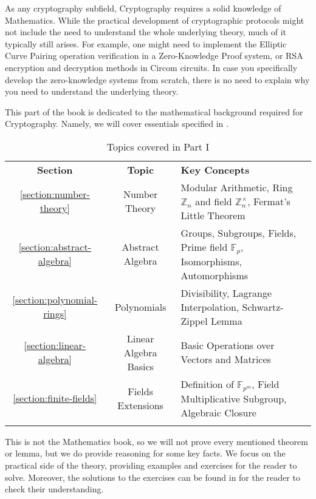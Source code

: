 \documentclass[../../lecture-notes-148x210.tex]{subfiles}
\begin{document}
As any cryptography subfield, Cryptography requires a solid knowledge of
Mathematics. While the practical development of cryptographic protocols might
not include the need to understand the whole underlying theory, much of it
typically still arises. For example, one might need to implement the Elliptic
Curve Pairing operation verification in a Zero-Knowledge Proof system, or RSA
encryption and decryption methods in Circom circuits. In case you specifically
develop the zero-knowledge systems from scratch, there is no need to explain why
you need to understand the underlying theory.

This part of the book is dedicated to the mathematical background required for
Cryptography. Namely, we will cover essentials specified in .

\begin{table}[H]
    \centering
    \begin{tabularx}{\textwidth}{ccX}
        \Xhline{3\arrayrulewidth}
        \rowcolor{blue!30}\textbf{Section} & \textbf{Topic} & \textbf{Key Concepts} \\
        \Xhline{3\arrayrulewidth}
        \rowcolor{blue!10}\ref{section:number-theory} & Number Theory & Modular
        Arithmetic, Ring $\mathbb{Z}_n$ and field $\mathbb{Z}_n^{\times}$,
        Fermat's Little Theorem \\
        \hdashline
        \rowcolor{blue!20}\ref{section:abstract-algebra} & Abstract Algebra &
        Groups, Subgroups, Fields, Prime field $\mathbb{F}_p$, Isomorphisms,
        Automorphisms \\
        \hdashline
        \rowcolor{blue!10}\ref{section:polynomial-rings} & Polynomials & Divisibility, Lagrange Interpolation, Schwartz-Zippel Lemma \\
        \hdashline
        \rowcolor{blue!20}\ref{section:linear-algebra} & Linear Algebra Basics & Basic Operations over Vectors and Matrices \\
        \hdashline
        \rowcolor{blue!10}\ref{section:finite-fields} & Fields Extensions & Definition of $\mathbb{F}_{p^m}$, Field Multiplicative Subgroup, Algebraic Closure \\
        \Xhline{3\arrayrulewidth}
    \end{tabularx}
    \caption{Topics covered in Part I}
    \label{tab:essentialls}
\end{table}

This is not the Mathematics book, so we will not prove every mentioned theorem
or lemma, but we do provide reasoning for some key facts. We
focus on the practical side of the theory, providing examples and exercises for
the reader to solve. Moreover, the solutions to the exercises can be found 
in  for the reader to check their understanding.
\end{document}
